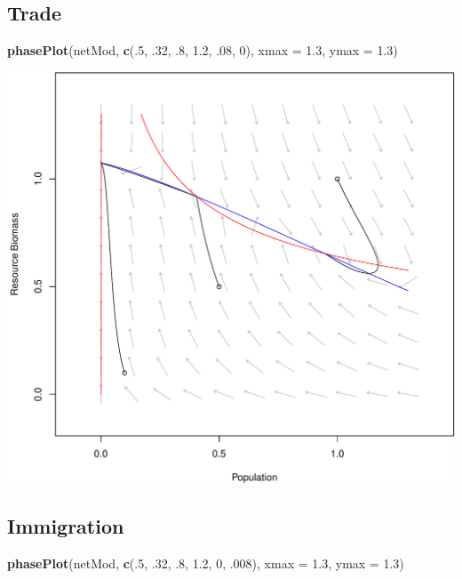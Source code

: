 \documentclass[]{article}
\newenvironment{Shaded}{\begin{snugshade}}{\end{snugshade}}
\newcommand{\KeywordTok}[1]{\textcolor[rgb]{0.13,0.29,0.53}{\textbf{{#1}}}}
\newcommand{\DataTypeTok}[1]{\textcolor[rgb]{0.13,0.29,0.53}{{#1}}}
\newcommand{\DecValTok}[1]{\textcolor[rgb]{0.00,0.00,0.81}{{#1}}}
\newcommand{\FloatTok}[1]{\textcolor[rgb]{0.00,0.00,0.81}{{#1}}}
\newcommand{\NormalTok}[1]{{#1}}
\begin{document}
\subsection{Trade}\label{trade}

\begin{Shaded}
\begin{Highlighting}[]
\KeywordTok{phasePlot}\NormalTok{(netMod, }\KeywordTok{c}\NormalTok{(.}\DecValTok{5}\NormalTok{, .}\DecValTok{32}\NormalTok{, .}\DecValTok{8}\NormalTok{, }\FloatTok{1.2}\NormalTok{, .}\DecValTok{08}\NormalTok{, }\DecValTok{0}\NormalTok{), }\DataTypeTok{xmax =} \FloatTok{1.3}\NormalTok{, }\DataTypeTok{ymax =} \FloatTok{1.3}\NormalTok{)}
\end{Highlighting}
\end{Shaded}

\includegraphics{consumerresource_files/figure-latex/unnamed-chunk-9-1.pdf}

\subsection{Immigration}\label{immigration}

\begin{Shaded}
\begin{Highlighting}[]
\KeywordTok{phasePlot}\NormalTok{(netMod, }\KeywordTok{c}\NormalTok{(.}\DecValTok{5}\NormalTok{, .}\DecValTok{32}\NormalTok{, .}\DecValTok{8}\NormalTok{, }\FloatTok{1.2}\NormalTok{, }\DecValTok{0}\NormalTok{, .}\DecValTok{008}\NormalTok{), }\DataTypeTok{xmax =} \FloatTok{1.3}\NormalTok{, }\DataTypeTok{ymax =} \FloatTok{1.3}\NormalTok{)}
\end{Highlighting}
\end{Shaded}
\end{document}
